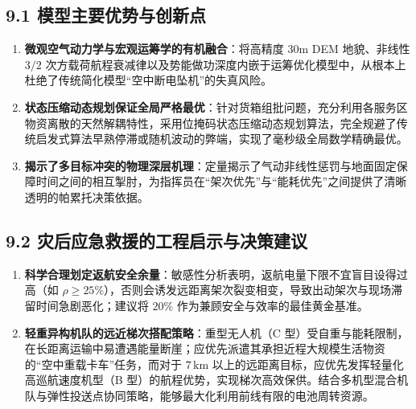 \documentclass[withoutpreface,bwprint]{format}
\begin{document}
\subsection{9.1 模型主要优势与创新点}
\begin{enumerate}[leftmargin=*]
    \item \textbf{微观空气动力学与宏观运筹学的有机融合}：将高精度 30m DEM 地貌、非线性 $3/2$ 次方载荷航程衰减律以及势能做功深度内嵌于运筹优化模型中，从根本上杜绝了传统简化模型“空中断电坠机”的失真风险。
    \item \textbf{状态压缩动态规划保证全局严格最优}：针对货箱组批问题，充分利用各服务区物资离散的天然解耦特性，采用位掩码状态压缩动态规划算法，完全规避了传统启发式算法早熟停滞或随机波动的弊端，实现了毫秒级全局数学精确最优。
    \item \textbf{揭示了多目标冲突的物理深层机理}：定量揭示了气动非线性惩罚与地面固定保障时间之间的相互掣肘，为指挥员在“架次优先”与“能耗优先”之间提供了清晰透明的帕累托决策依据。
\end{enumerate}

\subsection{9.2 灾后应急救援的工程启示与决策建议}
\begin{enumerate}[leftmargin=*]
    \item \textbf{科学合理划定返航安全余量}：敏感性分析表明，返航电量下限不宜盲目设得过高（如 $\rho \ge 25\%$），否则会诱发远距离架次裂变相变，导致出动架次与现场滞留时间急剧恶化；建议将 $20\%$ 作为兼顾安全与效率的最佳黄金基准。
    \item \textbf{轻重异构机队的远近梯次搭配策略}：重型无人机（C 型）受自重与能耗限制，在长距离运输中易遭遇能量断崖；应优先派遣其承担近程大规模生活物资的“空中重载卡车”任务，而对于 $7\,\text{km}$ 以上的远距离目标，应优先发挥轻量化高巡航速度机型（B 型）的航程优势，实现梯次高效保供。结合多机型混合机队与弹性投送点协同策略\cite{moshref2020}，能够最大化利用前线有限的电池周转资源。
\end{enumerate}
\end{document}
